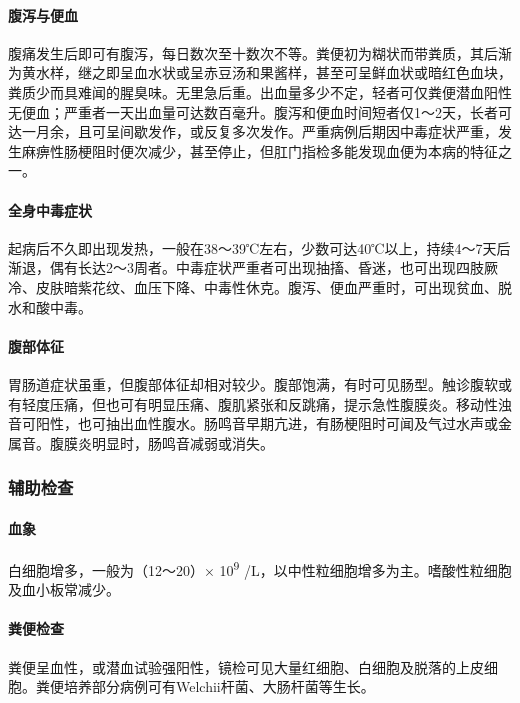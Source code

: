 \paragraph{腹泻与便血}

腹痛发生后即可有腹泻，每日数次至十数次不等。粪便初为糊状而带粪质，其后渐为黄水样，继之即呈血水状或呈赤豆汤和果酱样，甚至可呈鲜血状或暗红色血块，粪质少而具难闻的腥臭味。无里急后重。出血量多少不定，轻者可仅粪便潜血阳性无便血；严重者一天出血量可达数百毫升。腹泻和便血时间短者仅1～2天，长者可达一月余，且可呈间歇发作，或反复多次发作。严重病例后期因中毒症状严重，发生麻痹性肠梗阻时便次减少，甚至停止，但肛门指检多能发现血便为本病的特征之一。

\paragraph{全身中毒症状}

起病后不久即出现发热，一般在38～39℃左右，少数可达40℃以上，持续4～7天后渐退，偶有长达2～3周者。中毒症状严重者可出现抽搐、昏迷，也可出现四肢厥冷、皮肤暗紫花纹、血压下降、中毒性休克。腹泻、便血严重时，可出现贫血、脱水和酸中毒。

\paragraph{腹部体征}

胃肠道症状虽重，但腹部体征却相对较少。腹部饱满，有时可见肠型。触诊腹软或有轻度压痛，但也可有明显压痛、腹肌紧张和反跳痛，提示急性腹膜炎。移动性浊音可阳性，也可抽出血性腹水。肠鸣音早期亢进，有肠梗阻时可闻及气过水声或金属音。腹膜炎明显时，肠鸣音减弱或消失。

\subsubsection{辅助检查}

\paragraph{血象}

白细胞增多，一般为（12～20）× 10\textsuperscript{9}
/L，以中性粒细胞增多为主。嗜酸性粒细胞及血小板常减少。

\paragraph{粪便检查}

粪便呈血性，或潜血试验强阳性，镜检可见大量红细胞、白细胞及脱落的上皮细胞。粪便培养部分病例可有Welchii杆菌、大肠杆菌等生长。

